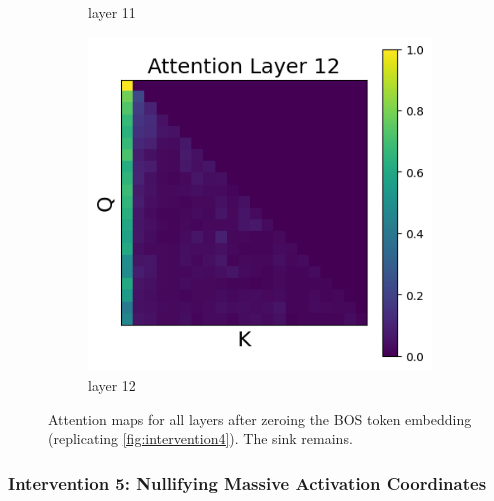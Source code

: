 \documentclass[11pt]{article}
\begin{document}
\begin{figure}[t]
\begin{subfigure}[t]{0.24\textwidth}
    \caption{layer 11}
  \end{subfigure}\hfill
  \begin{subfigure}[t]{0.24\textwidth}
    \centering
    \includegraphics[width=1.4\columnwidth]{figures/intervention4/layer_12.png}
    \caption{layer 12}
  \end{subfigure}\hfill

  \caption{Attention maps for all layers after zeroing the BOS token embedding (replicating \cref{fig:intervention4}). The sink remains.}
\end{figure}

\subsubsection{Intervention 5: Nullifying Massive Activation Coordinates}\label{app:intervention5}
\end{document}
